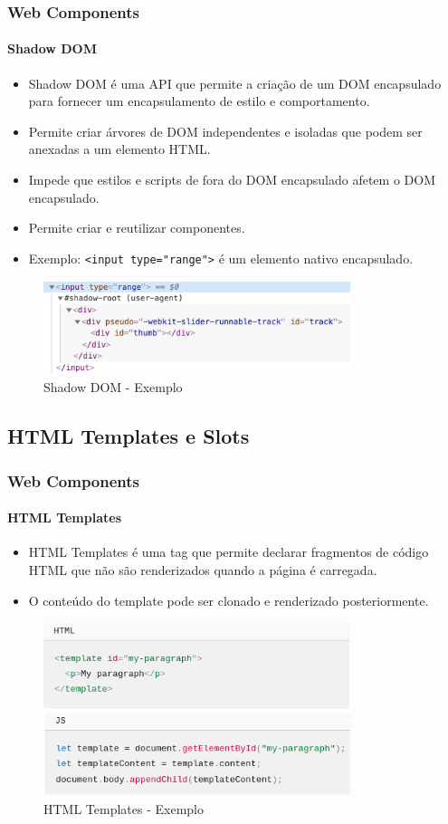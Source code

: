\documentclass[
	9pt, %
	t, %
]{beamer}
\begin{document}
\begin{frame}
	\frametitle{Web Components}
	\framesubtitle{Shadow DOM}
	\begin{itemize}
		\item Shadow DOM é uma API que permite a criação de um DOM encapsulado para fornecer um encapsulamento de estilo e comportamento.
		\item Permite criar árvores de DOM independentes e isoladas que podem ser anexadas a um elemento HTML.
		\item Impede que estilos e scripts de fora do DOM encapsulado afetem o DOM encapsulado.
		\item Permite criar e reutilizar componentes.
		\item Exemplo: \texttt{<input type="range">} é um elemento nativo encapsulado.
	\end{itemize}

	\begin{figure}
		\centering
		\includegraphics[width=0.8\textwidth]{shadow_dom_example.png}
		\caption{Shadow DOM - Exemplo}
	\end{figure}

\end{frame}

\subsection{HTML Templates e Slots}

\begin{frame}
	\frametitle{Web Components}
	\framesubtitle{HTML Templates}
	\begin{itemize}
		\item HTML Templates é uma tag que permite declarar fragmentos de código HTML que não são renderizados quando a página é carregada.
		\item O conteúdo do template pode ser clonado e renderizado posteriormente.
	\end{itemize}

	\begin{figure}
		\centering
		\includegraphics[width=0.8\textwidth]{html_templates.png}
		\caption{HTML Templates - Exemplo}
	\end{figure}

\end{frame}
\end{document}
